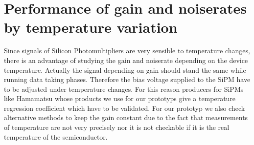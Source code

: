 \section{Performance of gain and noiserates by temperature variation}
Since signals of Silicon Photomultipliers are very sensible to temperature changes, there is an advantage of studying the gain and noiserate depending on the device temperature. Actually the signal depending on gain should stand the same while running data taking phases. Therefore the bias voltage supplied to the SiPM have to be adjusted under temperature changes. For this reason producers for SiPMs like Hamamatsu whose products we use for our prototyps give a temperature regression coefficient which have to be validated. For our prototyp we also check alternative methods to keep the gain constant due to the fact that measurements of temperature are not very precisely nor it is not checkable if it is the real temperature of the semiconductor.

